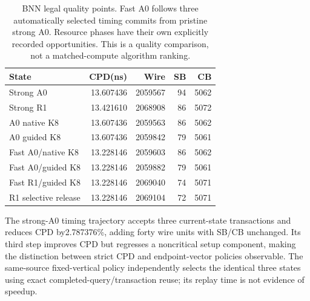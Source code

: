 \documentclass[conference,10pt]{IEEEtran}
\begin{document}
\begin{table}[t]
\centering\caption{BNN legal quality points. Fast A0 follows three automatically selected timing commits from pristine strong A0. Resource phases have their own explicitly recorded opportunities. This is a quality comparison, not a matched-compute algorithm ranking.}
\label{tab:bnn}
\small
\begin{tabular}{lrrrr}\hline
State & CPD(ns) & Wire & SB & CB\\\hline
Strong A0 &13.607436&2059567&94&5062\\
Strong R1 &13.421610&2068908&86&5072\\
A0 native K8 &13.607436&2059563&86&5062\\
A0 guided K8 &13.607436&2059842&79&5061\\
Fast A0/native K8 &13.228146&2059603&86&5062\\
Fast A0/guided K8 &13.228146&2059882&79&5061\\
Fast R1/guided K8 &13.228146&2069040&74&5071\\
R1 selective release &13.228146&2069104&72&5071\\\hline
\end{tabular}
\end{table}
The strong-A0 timing trajectory accepts three current-state transactions and reduces CPD by2.787376\%, adding forty wire units with SB/CB unchanged. Its third step improves CPD but regresses a noncritical setup component, making the distinction between strict CPD and endpoint-vector policies observable. The same-source fixed-vertical policy independently selects the identical three states using exact completed-query/transaction reuse; its replay time is not evidence of speedup.
\end{document}
